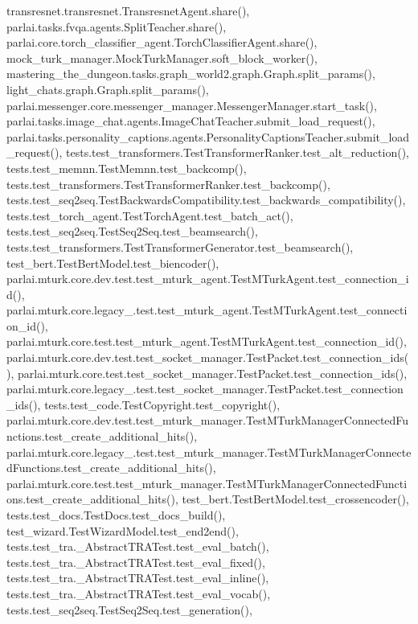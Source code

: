 transresnet.\+transresnet.\+Transresnet\+Agent.\+share(), parlai.\+tasks.\+fvqa.\+agents.\+Split\+Teacher.\+share(), parlai.\+core.\+torch\+\_\+classifier\+\_\+agent.\+Torch\+Classifier\+Agent.\+share(), mock\+\_\+turk\+\_\+manager.\+Mock\+Turk\+Manager.\+soft\+\_\+block\+\_\+worker(), mastering\+\_\+the\+\_\+dungeon.\+tasks.\+graph\+\_\+world2.\+graph.\+Graph.\+split\+\_\+params(), light\+\_\+chats.\+graph.\+Graph.\+split\+\_\+params(), parlai.\+messenger.\+core.\+messenger\+\_\+manager.\+Messenger\+Manager.\+start\+\_\+task(), parlai.\+tasks.\+image\+\_\+chat.\+agents.\+Image\+Chat\+Teacher.\+submit\+\_\+load\+\_\+request(), parlai.\+tasks.\+personality\+\_\+captions.\+agents.\+Personality\+Captions\+Teacher.\+submit\+\_\+load\+\_\+request(), tests.\+test\+\_\+transformers.\+Test\+Transformer\+Ranker.\+test\+\_\+alt\+\_\+reduction(), tests.\+test\+\_\+memnn.\+Test\+Memnn.\+test\+\_\+backcomp(), tests.\+test\+\_\+transformers.\+Test\+Transformer\+Ranker.\+test\+\_\+backcomp(), tests.\+test\+\_\+seq2seq.\+Test\+Backwards\+Compatibility.\+test\+\_\+backwards\+\_\+compatibility(), tests.\+test\+\_\+torch\+\_\+agent.\+Test\+Torch\+Agent.\+test\+\_\+batch\+\_\+act(), tests.\+test\+\_\+seq2seq.\+Test\+Seq2\+Seq.\+test\+\_\+beamsearch(), tests.\+test\+\_\+transformers.\+Test\+Transformer\+Generator.\+test\+\_\+beamsearch(), test\+\_\+bert.\+Test\+Bert\+Model.\+test\+\_\+biencoder(), parlai.\+mturk.\+core.\+dev.\+test.\+test\+\_\+mturk\+\_\+agent.\+Test\+M\+Turk\+Agent.\+test\+\_\+connection\+\_\+id(), parlai.\+mturk.\+core.\+legacy\+\_.\+test.\+test\+\_\+mturk\+\_\+agent.\+Test\+M\+Turk\+Agent.\+test\+\_\+connection\+\_\+id(), parlai.\+mturk.\+core.\+test.\+test\+\_\+mturk\+\_\+agent.\+Test\+M\+Turk\+Agent.\+test\+\_\+connection\+\_\+id(), parlai.\+mturk.\+core.\+dev.\+test.\+test\+\_\+socket\+\_\+manager.\+Test\+Packet.\+test\+\_\+connection\+\_\+ids(), parlai.\+mturk.\+core.\+test.\+test\+\_\+socket\+\_\+manager.\+Test\+Packet.\+test\+\_\+connection\+\_\+ids(), parlai.\+mturk.\+core.\+legacy\+\_.\+test.\+test\+\_\+socket\+\_\+manager.\+Test\+Packet.\+test\+\_\+connection\+\_\+ids(), tests.\+test\+\_\+code.\+Test\+Copyright.\+test\+\_\+copyright(), parlai.\+mturk.\+core.\+dev.\+test.\+test\+\_\+mturk\+\_\+manager.\+Test\+M\+Turk\+Manager\+Connected\+Functions.\+test\+\_\+create\+\_\+additional\+\_\+hits(), parlai.\+mturk.\+core.\+legacy\+\_.\+test.\+test\+\_\+mturk\+\_\+manager.\+Test\+M\+Turk\+Manager\+Connected\+Functions.\+test\+\_\+create\+\_\+additional\+\_\+hits(), parlai.\+mturk.\+core.\+test.\+test\+\_\+mturk\+\_\+manager.\+Test\+M\+Turk\+Manager\+Connected\+Functions.\+test\+\_\+create\+\_\+additional\+\_\+hits(), test\+\_\+bert.\+Test\+Bert\+Model.\+test\+\_\+crossencoder(), tests.\+test\+\_\+docs.\+Test\+Docs.\+test\+\_\+docs\+\_\+build(), test\+\_\+wizard.\+Test\+Wizard\+Model.\+test\+\_\+end2end(), tests.\+test\+\_\+tra.\+\_\+\+Abstract\+T\+R\+A\+Test.\+test\+\_\+eval\+\_\+batch(), tests.\+test\+\_\+tra.\+\_\+\+Abstract\+T\+R\+A\+Test.\+test\+\_\+eval\+\_\+fixed(), tests.\+test\+\_\+tra.\+\_\+\+Abstract\+T\+R\+A\+Test.\+test\+\_\+eval\+\_\+inline(), tests.\+test\+\_\+tra.\+\_\+\+Abstract\+T\+R\+A\+Test.\+test\+\_\+eval\+\_\+vocab(), tests.\+test\+\_\+seq2seq.\+Test\+Seq2\+Seq.\+test\+\_\+generation(), 